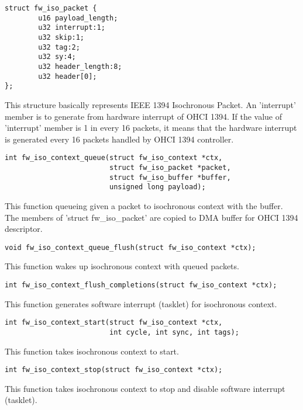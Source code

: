 \documentclass[onecolumn]{jarticle}
\begin{document}
\begin{verbatim}
struct fw_iso_packet {
        u16 payload_length;
        u32 interrupt:1;
        u32 skip:1;
        u32 tag:2;
        u32 sy:4;
        u32 header_length:8;
        u32 header[0];
};
\end{verbatim}

This structure basically represents IEEE 1394 Isochronous Packet. An 'interrupt' member is to generate from hardware interrupt of OHCI 1394. If the value of 'interrupt' member is 1 in every 16 packets, it means that the hardware interrupt is generated every 16 packets handled by OHCI 1394 controller.

\begin{verbatim}
int fw_iso_context_queue(struct fw_iso_context *ctx,
                         struct fw_iso_packet *packet,
                         struct fw_iso_buffer *buffer,
                         unsigned long payload);
\end{verbatim}

This function queueing given a packet to isochronous context with the buffer. The members of 'struct fw\_iso\_packet' are copied to DMA buffer for OHCI 1394 descriptor.

\begin{verbatim}
void fw_iso_context_queue_flush(struct fw_iso_context *ctx);
\end{verbatim}

This function wakes up isochronous context with queued packets.

\begin{verbatim}
int fw_iso_context_flush_completions(struct fw_iso_context *ctx);
\end{verbatim}

This function generates software interrupt (tasklet) for isochronous context.

\begin{verbatim}
int fw_iso_context_start(struct fw_iso_context *ctx,
                         int cycle, int sync, int tags);
\end{verbatim}

This function takes isochronous context to start.

\begin{verbatim}
int fw_iso_context_stop(struct fw_iso_context *ctx);
\end{verbatim}

This function takes isochronous context to stop and disable software interrupt (tasklet).
\end{document}
